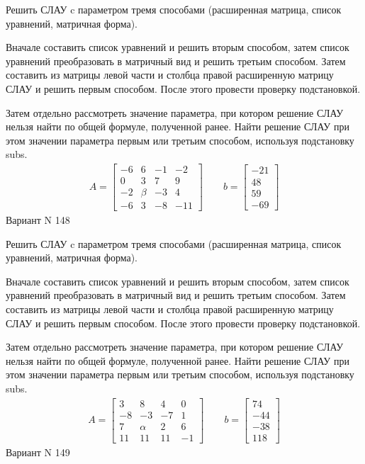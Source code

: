 \documentclass[11pt]{report}
\begin{document}
Решить СЛАУ c параметром тремя способами (расширенная матрица, список уравнений, матричная форма).

Вначале составить список уравнений и решить вторым способом,
затем список уравнений преобразовать в матричный вид и решить третьим способом.
Затем составить из матрицы левой части и столбца правой расширенную матрицу СЛАУ и решить первым способом.
После этого провести проверку подстановкой.

Затем отдельно рассмотреть значение параметра, при котором решение СЛАУ нельзя найти по общей формуле,
полученной ранее.
Найти решение СЛАУ при этом значении параметра первым или третьим способом, используя подстановку subs.
\begin{align*}
    A = \left[\begin{matrix}-6 & 6 & -1 & -2\\0 & 3 & 7 & 9\\-2 & \beta & -3 & 4\\-6 & 3 & -8 & -11\end{matrix}\right]
\qquad b = \left[\begin{matrix}-21\\48\\59\\-69\end{matrix}\right]
\end{align*}
\newpage
Вариант N 148


Решить СЛАУ c параметром тремя способами (расширенная матрица, список уравнений, матричная форма).

Вначале составить список уравнений и решить вторым способом,
затем список уравнений преобразовать в матричный вид и решить третьим способом.
Затем составить из матрицы левой части и столбца правой расширенную матрицу СЛАУ и решить первым способом.
После этого провести проверку подстановкой.

Затем отдельно рассмотреть значение параметра, при котором решение СЛАУ нельзя найти по общей формуле,
полученной ранее.
Найти решение СЛАУ при этом значении параметра первым или третьим способом, используя подстановку subs.
\begin{align*}
    A = \left[\begin{matrix}3 & 8 & 4 & 0\\-8 & -3 & -7 & 1\\7 & \alpha & 2 & 6\\11 & 11 & 11 & -1\end{matrix}\right]
\qquad b = \left[\begin{matrix}74\\-44\\-38\\118\end{matrix}\right]
\end{align*}
\newpage
Вариант N 149
\end{document}
